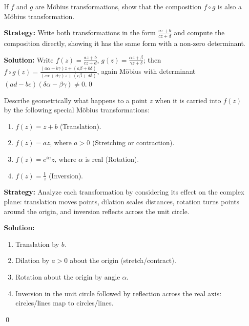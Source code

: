 \begin{problembox}
\begin{problemstatement}
If \( f \) and \( g \) are Möbius transformations, show that the composition \( f \circ g \) is also a Möbius transformation.
\end{problemstatement}
\end{problembox}

\noindent\textbf{Strategy:} Write both transformations in the form \( \frac{az+b}{cz+d} \) and compute the composition directly, showing it has the same form with a non-zero determinant.

\bigskip\noindent\textbf{Solution:}
Write $f(z)=\frac{a z+b}{c z+d}$, $g(z)=\frac{\alpha z+\beta}{\gamma z+\delta}$; then \\ $f\circ g(z)=\frac{(a\alpha+b\gamma)z+(a\beta+b\delta)}{(c\alpha+d\gamma)z+(c\beta+d\delta)}$, again Möbius with determinant $(ad-bc)(\delta\alpha-\beta\gamma)\ne0$.\qed


\begin{problembox}
\begin{problemstatement}
Describe geometrically what happens to a point \( z \) when it is carried into \( f(z) \) by the following special Möbius transformations:
\begin{enumerate}[label=(\alph*)]
\item \( f(z) = z + b \) (Translation).
\item \( f(z) = a z \), where \( a > 0 \) (Stretching or contraction).
\item \( f(z) = e^{i \alpha} z \), where \( \alpha \) is real (Rotation).
\item \( f(z) = \frac{1}{z} \) (Inversion).
\end{enumerate}
\end{problemstatement}
\end{problembox}

\noindent\textbf{Strategy:} Analyze each transformation by considering its effect on the complex plane: translation moves points, dilation scales distances, rotation turns points around the origin, and inversion reflects across the unit circle.

\bigskip\noindent\textbf{Solution:}
\begin{enumerate}[label=(\alph*)]
\item Translation by $b$.
\item Dilation by $a>0$ about the origin (stretch/contract).
\item Rotation about the origin by angle $\alpha$.
\item Inversion in the unit circle followed by reflection across the real axis: circles/lines map to circles/lines.
\end{enumerate}\qed


